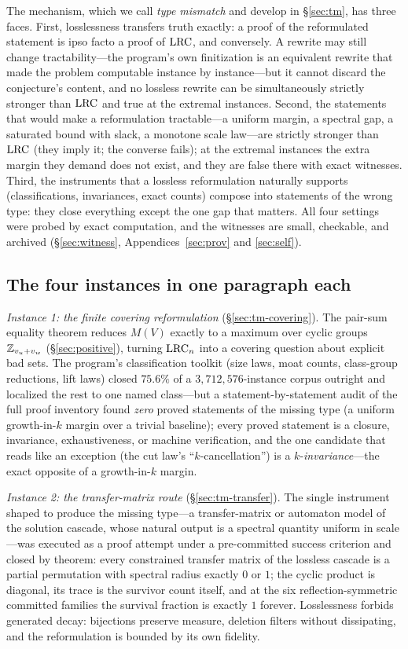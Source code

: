 The mechanism, which we call \emph{type mismatch} and develop in
\S\ref{sec:tm}, has three faces. First, losslessness transfers truth
exactly: a proof of the reformulated statement is ipso facto a proof of
$\mathrm{LRC}$, and conversely. A rewrite may still change tractability---the
program's own finitization is an equivalent rewrite that made the problem
computable instance by instance---but it cannot discard the conjecture's
content, and no lossless rewrite can be simultaneously strictly stronger
than $\mathrm{LRC}$ and true at the extremal instances. Second, the statements
that would make a reformulation tractable---a uniform margin, a spectral
gap, a saturated bound with slack, a monotone scale law---are strictly
stronger than $\mathrm{LRC}$ (they imply it; the converse fails); at the extremal
instances the extra margin they demand does not exist, and they are false
there with exact witnesses. Third, the instruments that a lossless
reformulation naturally supports (classifications, invariances, exact
counts) compose into statements of the wrong type: they close everything
except the one gap that matters. All four settings were probed by exact
computation, and the witnesses are small, checkable, and archived
(\S\ref{sec:witness}, Appendices~\ref{sec:prov} and \ref{sec:self}).

\subsection{The four instances in one paragraph each}

\emph{Instance 1: the finite covering reformulation}
(\S\ref{sec:tm-covering}). The pair-sum equality theorem reduces
$M(V)$ exactly to a maximum over cyclic groups $\mathbb{Z}_{v_u+v_w}$
(\S\ref{sec:positive}), turning $\mathrm{LRC}_n$ into a covering question about
explicit bad sets. The program's classification toolkit (size laws, moat
counts, class-group reductions, lift laws) closed $75.6\%$ of a
$3{,}712{,}576$-instance corpus outright and localized the rest to one
named class---but a statement-by-statement audit of the full proof
inventory found \emph{zero} proved statements of the missing type (a
uniform growth-in-$k$ margin over a trivial baseline); every proved
statement is a closure, invariance, exhaustiveness, or machine
verification, and the one candidate that reads like an exception (the cut
law's ``$k$-cancellation'') is a $k$-\emph{invariance}---the exact
opposite of a growth-in-$k$ margin.

\emph{Instance 2: the transfer-matrix route} (\S\ref{sec:tm-transfer}).
The single instrument shaped to produce the missing type---a
transfer-matrix or automaton model of the solution cascade, whose natural
output is a spectral quantity uniform in scale---was executed as a proof
attempt under a pre-committed success criterion and closed by theorem:
every constrained transfer matrix of the lossless cascade is a partial
permutation with spectral radius exactly $0$ or $1$; the cyclic product is
diagonal, its trace is the survivor count itself, and at the six
reflection-symmetric committed families the survival fraction is exactly
$1$ forever. Losslessness forbids generated decay: bijections preserve
measure, deletion filters without dissipating, and the reformulation is
bounded by its own fidelity.

